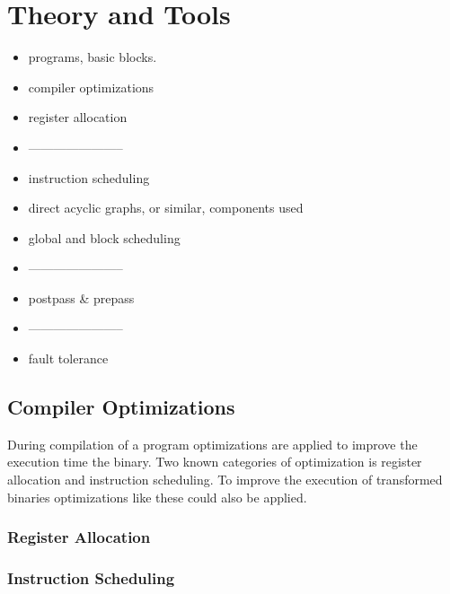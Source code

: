 \chapter{Theory and Tools}

\begin{itemize}
    \item programs, basic blocks.
    \item compiler optimizations
    \item register allocation
    \item -----------------------
    \item instruction scheduling
    \item direct acyclic graphs, or similar, components used
    \item global and block scheduling
    \item -----------------------
    \item postpass \& prepass
    \item -----------------------
    
    \item fault tolerance

\end{itemize}



\section{Compiler Optimizations}
During compilation of a program optimizations are applied
to improve the execution time the binary. Two known categories
of optimization is register allocation and instruction scheduling.
To improve the execution of transformed binaries optimizations
like these could also be applied.

\subsection{Register Allocation}


\subsection{Instruction Scheduling}


